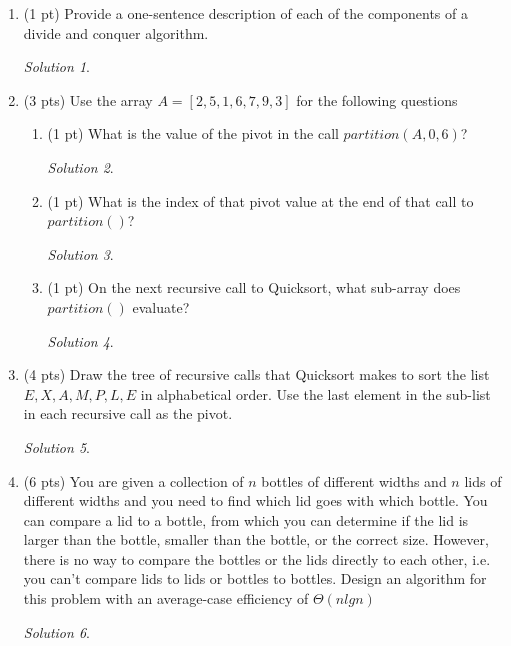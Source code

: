 \documentclass[12pt]{article}
\theoremstyle{remark}
\newtheorem*{solution}{Solution}
\begin{document}
\begin{enumerate}

    \item (1 pt) Provide a one-sentence description of each of the components of a divide and conquer algorithm.
    
    \begin{solution}
    
    \end{solution}
    
    \item (3 pts) Use the array $A=[2,5,1,6,7,9,3]$ for the following questions
    \begin{enumerate}
        \item (1 pt) What is the value of the pivot in the call $partition(A,0,6)$?
        
        \begin{solution}
        
        \end{solution}
        
        \item (1 pt) What is the index of that pivot value at the end of that call to $partition()$?
        
        \begin{solution}
        
        \end{solution}
        
        \item (1 pt) On the next recursive call to Quicksort, what sub-array does $partition()$ evaluate?
        
        \begin{solution}
        
        \end{solution}
        
    \end{enumerate}
	\item (4 pts) Draw the tree of recursive calls that Quicksort makes to sort the list \\${E,X,A,M,P,L,E}$ in alphabetical order. Use the last element in the sub-list in each recursive call as the pivot.
	
	\begin{solution}
        
    \end{solution}
	

    \item (6 pts) You are given a collection of $n$ bottles of different widths and $n$ lids of different widths and you need to find which lid goes with which bottle. You can compare a lid to a bottle, from which you can determine if the lid is larger than the bottle, smaller than the bottle, or the correct size. However, there is no way to compare the bottles or the lids directly to each other, i.e. you can't compare lids to lids or bottles to bottles. Design an algorithm for this problem with an average-case efficiency of $\Theta(nlgn)$
    
    \begin{solution}
        
    \end{solution}
    
\end{enumerate}
\end{document}
